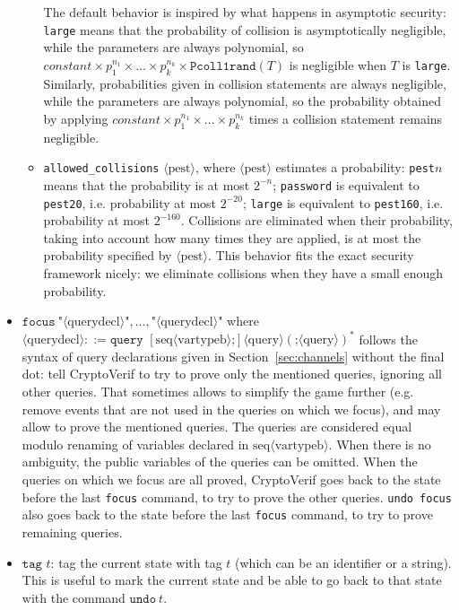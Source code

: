 \documentclass{article}
\newcommand{\nonterm}[1]{\langle\textrm{#1}\rangle}
\newcommand{\seq}[1]{\textrm{seq}\nonterm{#1}}
\begin{document}
\begin{itemize}
\begin{itemize}
The default behavior is inspired by what happens in asymptotic security: \texttt{large} means that the probability of collision is asymptotically negligible, while the parameters are always polynomial, so $\textit{constant} \times p_1^{n_1} \times \dots \times p_k^{n_k} \times \texttt{Pcoll1rand}(T)$ is negligible when $T$ is \texttt{large}. Similarly, probabilities given in collision statements are always negligible, while the parameters are always polynomial, so the probability obtained by applying $\textit{constant} \times p_1^{n_1} \times \dots \times p_k^{n_k}$ times a collision statement remains negligible.

\item \texttt{allowed\string_collisions} $\nonterm{pest}$, where $\nonterm{pest}$ estimates a probability: \texttt{pest$n$} means that the probability is at most $2^{-n}$;
\texttt{password} is equivalent to \texttt{pest20}, i.e. probability at most $2^{-20}$;
\texttt{large} is equivalent to \texttt{pest160}, i.e. probability at most $2^{-160}$. Collisions are eliminated when their probability, taking into account how many times they are applied, is at most the probability specified by $\nonterm{pest}$. This behavior fits the exact security framework nicely: we eliminate collisions when they have a small enough probability.

\end{itemize}
\item $\texttt{focus}\ \texttt{"}\nonterm{querydecl}\texttt{"}, \dots, \texttt{"}\nonterm{querydecl}\texttt{"}$ where
  $\nonterm{querydecl} ::= \texttt{query }[\seq{vartypeb}\texttt{;}]\nonterm{query} (\texttt{;}\allowbreak\nonterm{query})^*$
  follows the syntax of query declarations given in Section~\ref{sec:channels} without the final dot:
  tell CryptoVerif to try to prove only the mentioned queries, ignoring all other queries.
  That sometimes allows to simplify the game further (e.g. remove events that are not used in the queries on which we focus),
  and may allow to prove the mentioned queries.
  The queries are considered equal modulo renaming of variables declared in $\seq{vartypeb}$. When there is no ambiguity, the public variables of the queries can be omitted.
  When the queries on which we focus are all proved,
  CryptoVerif goes back to the state before the last \texttt{focus} command, to try
  to prove the other queries.
  \texttt{undo focus}
  also goes back to the state before the last \texttt{focus} command, to try
  to prove remaining queries.

\item $\texttt{tag }t$: tag the current state with tag $t$ (which can be an identifier or a string).
  This is useful to mark the current state and be able to go back to that state with the command $\texttt{undo}\ t$.


\end{itemize}
\end{document}
